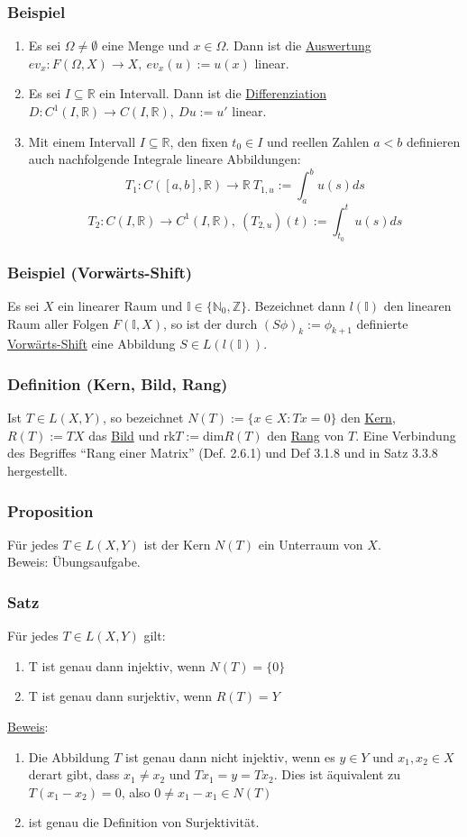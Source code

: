 \subsubsection{Beispiel}
\begin{enumerate}
\item Es sei $\Omega \not= \emptyset$ eine Menge und $x\in \Omega$.  Dann ist die \underline{Auswertung} $ev_x: F(\Omega ,X)\rightarrow X,\ ev_x(u):=u(x)$ linear.
\item Es sei $I\subseteq \mathbb{R}$ ein Intervall.  Dann ist die \underline{Differenziation} $D:C^1(I,\mathbb{R})\rightarrow C(I,\mathbb{R}),\ Du:=u'$ linear.
\item Mit einem Intervall $I\subseteq \mathbb{R}$, den fixen $t_0\in I$ und reellen Zahlen $a<b$ definieren auch nachfolgende Integrale lineare Abbildungen:
\[T_1:C([a,b],\mathbb{R})\rightarrow \mathbb{R}\ T_{1,u}:=\int_a^b u(s)ds\]
\[T_2:C(I,\mathbb{R})\rightarrow C^1(I,\mathbb{R}),\ (T_{2,u})(t):=\int_{t_0}^t u(s)ds\]
\end{enumerate}
\subsubsection{Beispiel (Vorwärts-Shift)}
Es sei $X$ ein linearer Raum und $\mathbb{I}\in\{\mathbb{N}_0,\mathbb{Z}\}$.  Bezeichnet dann $l(\mathbb{I})$ den linearen Raum aller Folgen $F(\mathbb{I},X)$, so ist der durch $(S\phi )_k:=\phi _{k+1}$ definierte \underline{Vorwärts-Shift} eine Abbildung $S\in L(l(\mathbb{I}))$.
\subsubsection{Definition (Kern, Bild, Rang)}
Ist $T\in L(X,Y)$, so bezeichnet $N(T):=\{x\in X:Tx=0\}$ den \underline{Kern}, $R(T):=TX$ das \underline{Bild} und rk$T:=$dim$R(T)$ den \underline{Rang} von $T$.  Eine Verbindung des Begriffes "`Rang einer Matrix"' (Def. 2.6.1) und Def 3.1.8 und in Satz 3.3.8 hergestellt.
\subsubsection{Proposition}
Für jedes $T\in L(X,Y)$ ist der Kern $N(T)$ ein Unterraum von $X$.\\
Beweis: Übungsaufgabe.
\subsubsection{Satz}
Für jedes $T\in L(X,Y)$ gilt:
\renewcommand{\labelenumi}{(\alph{enumi})}
\begin{enumerate}
\item T ist genau dann injektiv, wenn $N(T)=\{0\}$
\item T ist genau dann surjektiv, wenn $R(T)=Y$
\end{enumerate}
\underline{Beweis}:
\begin{enumerate}
\item Die Abbildung $T$ ist genau dann nicht injektiv, wenn es $y\in Y$ und $x_1,x_2\in X$ derart gibt, dass $x_1\not= x_2$ und $Tx_1=y=Tx_2$.  Dies ist äquivalent zu $T(x_1-x_2)=0$, also $0 \not= x_1-x_1 \in N(T)$
\item ist genau die Definition von Surjektivität.
\end{enumerate}
